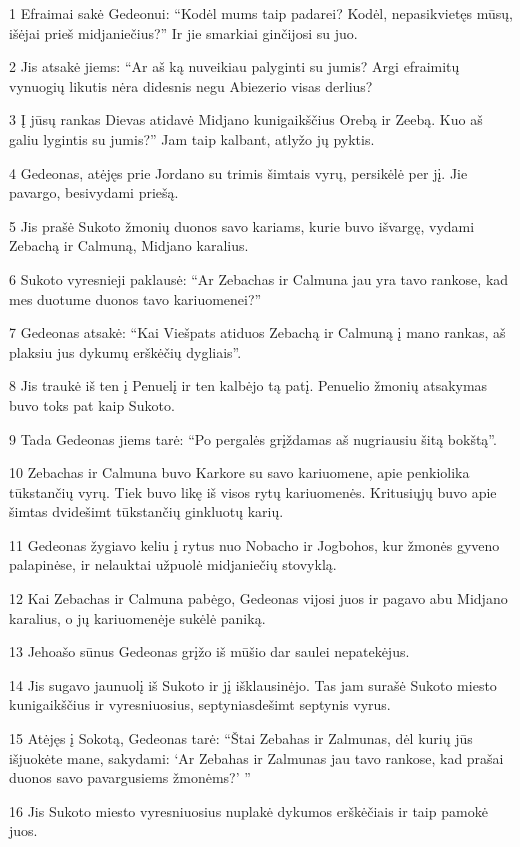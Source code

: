 \par 1 Efraimai sakė Gedeonui: “Kodėl mums taip padarei? Kodėl, nepasikvietęs mūsų, išėjai prieš midjaniečius?” Ir jie smarkiai ginčijosi su juo. 
\par 2 Jis atsakė jiems: “Ar aš ką nuveikiau palyginti su jumis? Argi efraimitų vynuogių likutis nėra didesnis negu Abiezerio visas derlius? 
\par 3 Į jūsų rankas Dievas atidavė Midjano kunigaikščius Orebą ir Zeebą. Kuo aš galiu lygintis su jumis?” Jam taip kalbant, atlyžo jų pyktis. 
\par 4 Gedeonas, atėjęs prie Jordano su trimis šimtais vyrų, persikėlė per jį. Jie pavargo, besivydami priešą. 
\par 5 Jis prašė Sukoto žmonių duonos savo kariams, kurie buvo išvargę, vydami Zebachą ir Calmuną, Midjano karalius. 
\par 6 Sukoto vyresnieji paklausė: “Ar Zebachas ir Calmuna jau yra tavo rankose, kad mes duotume duonos tavo kariuomenei?” 
\par 7 Gedeonas atsakė: “Kai Viešpats atiduos Zebachą ir Calmuną į mano rankas, aš plaksiu jus dykumų erškėčių dygliais”. 
\par 8 Jis traukė iš ten į Penuelį ir ten kalbėjo tą patį. Penuelio žmonių atsakymas buvo toks pat kaip Sukoto. 
\par 9 Tada Gedeonas jiems tarė: “Po pergalės grįždamas aš nugriausiu šitą bokštą”. 
\par 10 Zebachas ir Calmuna buvo Karkore su savo kariuomene, apie penkiolika tūkstančių vyrų. Tiek buvo likę iš visos rytų kariuomenės. Kritusiųjų buvo apie šimtas dvidešimt tūkstančių ginkluotų karių. 
\par 11 Gedeonas žygiavo keliu į rytus nuo Nobacho ir Jogbohos, kur žmonės gyveno palapinėse, ir nelauktai užpuolė midjaniečių stovyklą. 
\par 12 Kai Zebachas ir Calmuna pabėgo, Gedeonas vijosi juos ir pagavo abu Midjano karalius, o jų kariuomenėje sukėlė paniką. 
\par 13 Jehoašo sūnus Gedeonas grįžo iš mūšio dar saulei nepatekėjus. 
\par 14 Jis sugavo jaunuolį iš Sukoto ir jį išklausinėjo. Tas jam surašė Sukoto miesto kunigaikščius ir vyresniuosius, septyniasdešimt septynis vyrus. 
\par 15 Atėjęs į Sokotą, Gedeonas tarė: “Štai Zebahas ir Zalmunas, dėl kurių jūs išjuokėte mane, sakydami: ‘Ar Zebahas ir Zalmunas jau tavo rankose, kad prašai duonos savo pavargusiems žmonėms?’ ” 
\par 16 Jis Sukoto miesto vyresniuosius nuplakė dykumos erškėčiais ir taip pamokė juos. 

